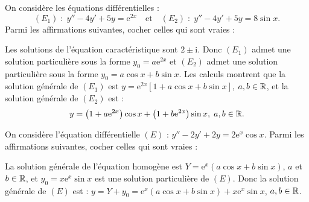 \begin{question}
On considère les équations différentielles :
$$(E_1)\; :\; y''-4y'+5y=\mathrm{e}^{2x}\quad \mbox{et}\quad (E_2)\; :\; y''-4y'+5y=8\sin x.$$
Parmi les affirmations suivantes, cocher celles qui sont vraies :
\begin{answers}  
\end{answers}
\begin{explanations}
Les solutions de l'équation caractéristique sont $2\pm \mathrm{i}$. Donc $(E_1)$ admet une solution particulière sous la forme $\displaystyle y_0=a\mathrm{e}^{2x}$ et $(E_2)$ admet une solution particulière sous la forme $\displaystyle y_0=a\cos x+b\sin x$. Les calculs montrent que la solution générale de $(E_1)$ est $\displaystyle y=\mathrm{e}^{2x}\left[1+a\cos x+b\sin x\right]$, $a,b\in \mathbb{R}$, et la solution générale de $(E_2)$ est : 
$$y=\left(1+a\mathrm{e}^{2x}\right)\cos x+\left(1+b\mathrm{e}^{2x}\right)\sin x,\; a,b\in \mathbb{R}.$$
\end{explanations}
\end{question}

\begin{question}
On considère l'équation différentielle $(E)$ : $y''-2y'+2y=2\mathrm{e}^{x}\cos x$. Parmi les affirmations suivantes, cocher celles qui sont vraies :
\begin{answers}
\end{answers}
\begin{explanations}
La solution générale de l'équation homogène est $Y=\mathrm{e}^{x}\left(a\cos x+b\sin x\right)$, $a$ et $b\in\mathbb{R}$, et $\displaystyle y_0=x\mathrm{e}^{x}\sin x$ est une solution particulière de $(E)$. Donc la solution générale de $(E)$ est : $\displaystyle y=Y+y_0=\mathrm{e}^{x}\left(a\cos x+b\sin x\right)+x\mathrm{e}^{x}\sin x$, $a,b\in \mathbb{R}$.
\end{explanations}
\end{question}

